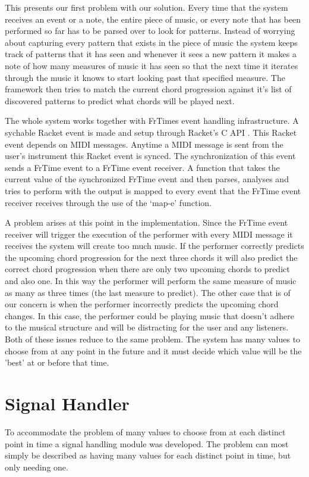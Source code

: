 \documentclass[12pt]{ucthesis}
\begin{document}
{This presents our first problem with our solution. Every time that the system receives an event or a note, the entire piece of music, or every note that has been performed so far has to be parsed over to look for patterns. Instead of worrying about capturing every pattern that exists in the piece of music the system keeps track of patterns that it has seen and whenever it sees a new pattern it makes a note of how many measures of music it has seen so that the next time it iterates through the music it knows to start looking past that specified measure. The framework then tries to match the current chord progression against it's list of discovered patterns to predict what chords will be played next.

The whole system works together with FrTimes event handling infrastructure. A sychable Racket event is made and setup through Racket's C API . This Racket event depends on MIDI messages. Anytime a MIDI message is sent from the user's instrument this Racket event is synced. The synchronization of this event sends a FrTime event to a FrTime event receiver. A function that takes the current value of the synchronized FrTime event and then parses, analyses and tries to perform with the output is mapped to every event that the FrTime event receiver receives through the use of the `map-e' function.

A problem arises at this point in the implementation. Since the FrTime event receiver will trigger the execution of the performer with every MIDI message it receives the system will create too much music. If the performer correctly predicts the upcoming chord progression for the next three chords it will also predict the correct chord progression when there are only two upcoming chords to predict and also one. In this way the performer will perform the same measure of music as many as three times (the last measure to predict). The other case that is of our concern is when the performer incorrectly predicts the upcoming chord changes. In this case, the performer could be playing music that doesn't adhere to the musical structure and will be distracting for the user and any listeners. Both of these issues reduce to the same problem. The system has many values to choose from at any point in the future and it must decide which value will be the 'best' at or before that time.

\section{Signal Handler}
\label {signal-handler}
To accommodate the problem of many values to choose from at each distinct point in time a signal handling module was developed. The problem can most simply be described as having many values for each distinct point in time, but only needing one. 

}
\end{document}
